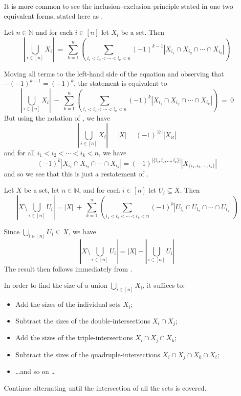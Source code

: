 It is more common to see the inclusion--exclusion principle stated in one two equivalent forms, stated here as .

\begin{corollary}
\label{corIEPSizeOfUnion}
Let $n \in \mathbb{N}$ and for each $i \in [n]$ let $X_i$ be a set. Then
\[ \left| \bigcup_{i \in [n]} X_i \right| ~=~ \sum_{k=1}^n \left( \sum_{i_1 < i_2 < \cdots < i_k < n} (-1)^{k-1} |X_{i_1} \cap X_{i_2} \cap \cdots \cap X_{i_k}| \right) \]
\end{corollary}

\begin{cproof}
Moving all terms to the left-hand side of the equation and observing that $-(-1)^{k-1} = (-1)^k$, the statement is equivalent to
\[ \left| \bigcup_{i \in [n]} X_i \right| ~-~ \sum_{k=1}^n \left( \sum_{i_1 < i_2 < \cdots < i_k < n} (-1)^k |X_{i_1} \cap X_{i_2} \cap \cdots \cap X_{i_k}| \right) ~=~ 0 \]
But using the notation of , we have
\[
\left| \bigcup_{i \in [n]} X_i \right| = |X| = (-1)^{|\varnothing|} |X_{\varnothing}|
\]
and for all $i_1 < i_2 < \cdots < i_k < n$, we have
\[
(-1)^k |X_{i_1} \cap X_{i_2} \cap \cdots \cap X_{i_k}| = (-1)^{|\{i_1,i_2,\dots,i_k\}|} |X_{\{i_1,i_2,\dots,i_k\}}|
\]
and so we see that this is just a restatement of .
\end{cproof}

\begin{corollary}
\label{corIEPSizeOfComplement}
Let $X$ be a set, let $n \in \mathbb{N}$, and for each $i \in [n]$ let $U_i \subseteq X$. Then
\[
\left| X \setminus \bigcup_{i \in [n]} U_i \right| = |X| ~+~ \sum_{k=1}^n \left( \sum_{i_1 < i_2 < \cdots < i_k < n} (-1)^k |U_{i_1} \cap U_{i_2} \cap \cdots \cap U_{i_k}| \right)
\]
\end{corollary}

\begin{cproof}
Since $\bigcup_{i \in [n]} U_i \subseteq X$, we have
\[
\left| X \setminus \bigcup_{i \in [n]} U_i \right| = |X| - \left| \bigcup_{i \in [n]} U_i \right|
\]
The result then follows immediately from .
\end{cproof}

\begin{strategy}
In order to find the size of a union $\bigcup_{i \in [n]} X_i$, it suffices to:
\begin{itemize}
\item Add the sizes of the individual sets $X_i$;
\item Subtract the sizes of the double-intersections $X_i \cap X_j$;
\item Add the sizes of the triple-intersections $X_i \cap X_j \cap X_k$;
\item Subtract the sizes of the quadruple-intersections $X_i \cap X_j \cap X_k \cap X_{\ell}$;
\item \dots and so on \dots
\end{itemize}
Continue alternating until the intersection of all the sets is covered.
\end{strategy}

